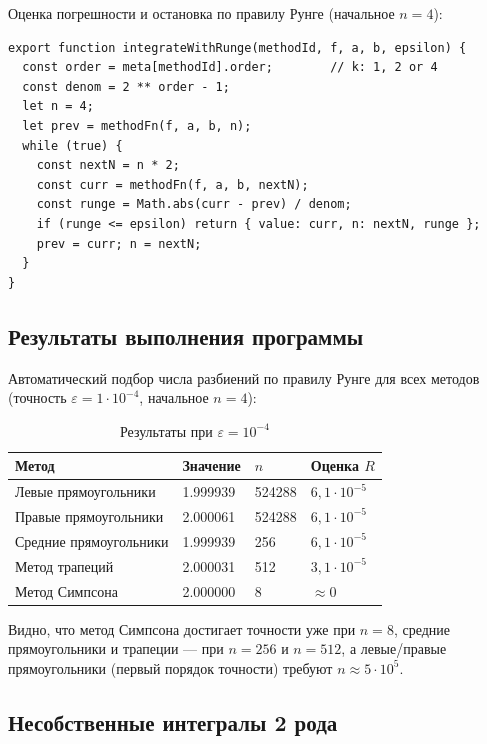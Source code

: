 \documentclass[12pt,a4paper]{article}
\begin{document}
Оценка погрешности и остановка по правилу Рунге (начальное $n=4$):

\begin{lstlisting}
export function integrateWithRunge(methodId, f, a, b, epsilon) {
  const order = meta[methodId].order;        // k: 1, 2 or 4
  const denom = 2 ** order - 1;
  let n = 4;
  let prev = methodFn(f, a, b, n);
  while (true) {
    const nextN = n * 2;
    const curr = methodFn(f, a, b, nextN);
    const runge = Math.abs(curr - prev) / denom;
    if (runge <= epsilon) return { value: curr, n: nextN, runge };
    prev = curr; n = nextN;
  }
}
\end{lstlisting}

\subsection{Результаты выполнения программы}

Автоматический подбор числа разбиений по правилу Рунге для всех методов
(точность $\varepsilon=1\cdot10^{-4}$, начальное $n=4$):

\begin{table}[H]
  \centering
  \caption{Результаты при $\varepsilon=10^{-4}$}
  \begin{tabular}{C{5.4cm}C{2.8cm}C{2.2cm}C{2.8cm}}
    \toprule
    \textbf{Метод} & \textbf{Значение} & \textbf{$n$} & \textbf{Оценка $R$} \\
    \midrule
    Левые прямоугольники & 1.999939 & 524288 & $6{,}1\cdot10^{-5}$ \\
    Правые прямоугольники & 2.000061 & 524288 & $6{,}1\cdot10^{-5}$ \\
    Средние прямоугольники & 1.999939 & 256 & $6{,}1\cdot10^{-5}$ \\
    Метод трапеций & 2.000031 & 512 & $3{,}1\cdot10^{-5}$ \\
    Метод Симпсона & 2.000000 & 8 & $\approx 0$ \\
    \bottomrule
  \end{tabular}
\end{table}

Видно, что метод Симпсона достигает точности уже при $n=8$, средние прямоугольники и
трапеции — при $n=256$ и $n=512$, а левые/правые прямоугольники (первый порядок точности)
требуют $n\approx5\cdot10^{5}$.

\subsection{Несобственные интегралы 2 рода}
\end{document}
